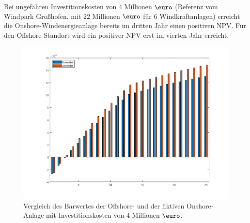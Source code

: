 \documentclass[a4paper,12pt]{article}
\begin{document}
	Bei ungefähren Investitionskosten von $4$ Millionen $\mbox{\euro}$ (Referenz vom Windpark Großhofen, mit $22$ Millionen $\mbox{\euro}$ für $6$ Windkraftanlagen) erreicht die Onshore-Windenergieanlage bereits im dritten Jahr einen positiven NPV. Für den Offshore-Standort wird ein positiver NPV erst im vierten Jahr erreicht.
	\begin{figure}[H]
		\centering
		\includegraphics[width=12cm]{img/results/BarwertOnshoreOffshoreInvestitionskosten}
		\caption{Vergleich des Barwertes der Offshore- und der fiktiven Onshore-Anlage mit Investitionskosten von $4$ Millionen $\mbox{\euro}$.}
	\end{figure}
\end{document}
